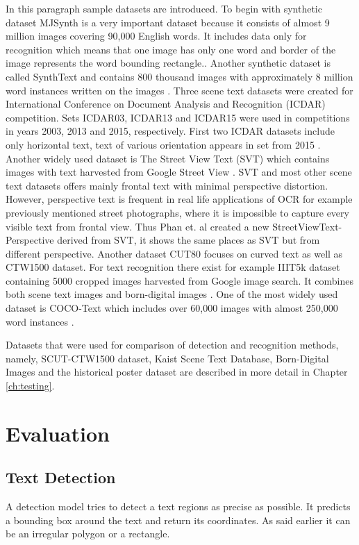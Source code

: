 In this paragraph sample datasets are introduced. To begin with synthetic dataset MJSynth is a very important dataset because it consists of almost 9 million images covering 90,000 English words. It includes data only for recognition which means that one image has only one word and border of the image  represents the word bounding rectangle.\cite{mjsynth}. Another synthetic dataset is called SynthText and contains 800 thousand images with approximately 8 million word instances written on the images \cite{synthtext}. Three scene text datasets were created for International Conference on Document Analysis and Recognition (ICDAR) competition. Sets ICDAR03, ICDAR13 and ICDAR15 were used in competitions in years 2003, 2013 and 2015, respectively. First two ICDAR datasets include only horizontal text, text of various orientation appears  in set from 2015 \cite{raisi2020text}. Another widely used dataset is The Street View Text (SVT) which contains images with text harvested from Google Street View \cite{svt}. SVT and most other scene text datasets offers mainly frontal text with minimal perspective distortion. However, perspective text is frequent in real life applications of OCR for example previously mentioned street photographs, where it is impossible to capture every visible text from frontal view. Thus Phan et. al \cite{svtp} created a new StreetViewText-Perspective derived from SVT, it shows the same places as SVT but from different perspective. Another dataset CUT80 focuses on curved text as well as CTW1500 dataset. For text recognition there exist for example IIIT5k dataset containing 5000 cropped images harvested from Google image search. It combines both scene text images and born-digital images \cite{IIIT}. One of the most widely used dataset is COCO-Text which includes over 60,000 images with almost 250,000 word instances \cite{coco}.

Datasets that were used for comparison of detection and recognition methods, namely, SCUT-CTW1500 dataset, Kaist Scene Text Database, Born-Digital Images and the historical poster dataset are described in more detail in Chapter \ref{ch:testing}. 

\section{Evaluation}
\label{sec:eval}

\subsection*{Text Detection}
A detection model tries to detect a text regions as precise as possible. It predicts a bounding box around the text and return its coordinates. As said earlier it can be an irregular polygon or a rectangle.

